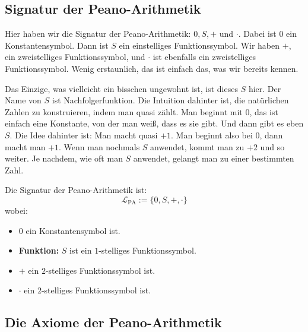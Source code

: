\subsection{Signatur der Peano-Arithmetik}

\begin{spoken-clean}[00:06:29 - 00:07:37]
Hier haben wir die Signatur der Peano-Arithmetik: $0, S, +$ und $\cdot$. Dabei ist $0$ ein Konstantensymbol. Dann ist $S$ ein einstelliges Funktionssymbol. Wir haben $+$, ein zweistelliges Funktionssymbol, und $\cdot$ ist ebenfalls ein zweistelliges Funktionssymbol. Wenig erstaunlich, das ist einfach das, was wir bereits kennen.

Das Einzige, was vielleicht ein bisschen ungewohnt ist, ist dieses $S$ hier. Der Name von $S$ ist Nachfolgerfunktion. Die Intuition dahinter ist, die natürlichen Zahlen zu konstruieren, indem man quasi zählt. Man beginnt mit $0$, das ist einfach eine Konstante, von der man weiß, dass es sie gibt. Und dann gibt es eben $S$. Die Idee dahinter ist: Man macht quasi $+1$. Man beginnt also bei $0$, dann macht man $+1$. Wenn man nochmals $S$ anwendet, kommt man zu $+2$ und so weiter. Je nachdem, wie oft man $S$ anwendet, gelangt man zu einer bestimmten Zahl.
\end{spoken-clean}

\begin{math-stroke}
Die Signatur der Peano-Arithmetik ist:
\[
\mathcal{L}_{\text{PA}} := \{0, S, +, \cdot\}
\]
wobei:
\begin{itemize}
    \item \textbf{$0$} ein Konstantensymbol ist.
    \item \textbf{Funktion:}  $S$ ist ein $1$-stelliges Funktionssymbol.
    \item \textbf{$+$} ein $2$-stelliges Funktionssymbol ist.
    \item \textbf{$\cdot$} ein $2$-stelliges Funktionssymbol ist.
\end{itemize}
\end{math-stroke}

\subsection{Die Axiome der Peano-Arithmetik}

